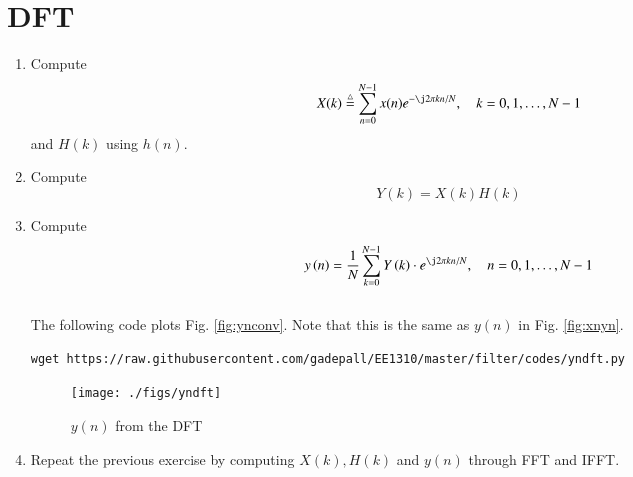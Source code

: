 \documentclass[journal,12pt,twocolumn]{IEEEtran}
\renewcommand\thesection{\arabic{section}}
\begin{document}
%
\section{DFT }
\begin{enumerate}[label=\thesection.\arabic*]
\item
Compute
\begin{equation}
X(k) \define \sum _{n=0}^{N-1}x(n) e^{-\j2\pi kn/N}, \quad k = 0,1,\dots, N-1
\end{equation}
and $H(k)$ using $h(n)$.
\item Compute 
\begin{equation}
Y(k) = X(k)H(k)
\end{equation}
\item Compute
\begin{equation}
 y\brak{n}={\frac {1}{N}}\sum _{k=0}^{N-1}Y\brak{k}\cdot e^{\j 2\pi kn/N},\quad n = 0,1,\dots, N-1
\end{equation}
\\
\solution The following code plots Fig. \ref{fig:ynconv}. Note that this is the same as 
$y(n)$ in  Fig. 
\ref{fig:xnyn}. 
%
\begin{lstlisting}
wget https://raw.githubusercontent.com/gadepall/EE1310/master/filter/codes/yndft.py
\end{lstlisting}
\begin{figure}[!ht]
\centering
\texttt{[image: ./figs/yndft]}
\caption{$y(n)$ from the DFT}
\label{fig:yndft}
\end{figure}

\item Repeat the previous exercise by computing $X(k), H(k)$ and $y(n)$ through FFT and 
IFFT.
\end{enumerate}
%
\end{document}
